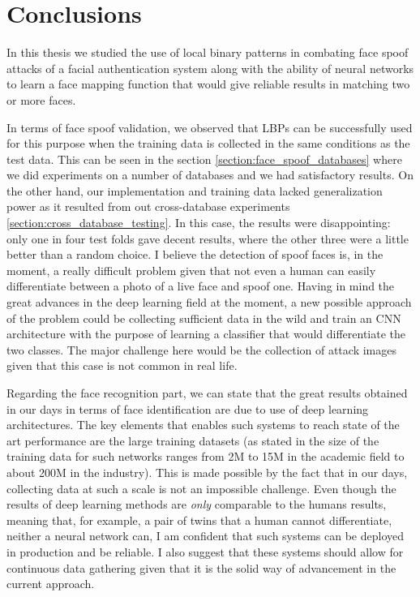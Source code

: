 \afterpage{\blankpage}
\chapter{Conclusions}
In this thesis we studied the use of local binary patterns in combating face spoof attacks of a facial authentication system along with the ability of neural networks to learn a face mapping function that would give reliable results in matching two or more faces. 

In terms of face spoof validation, we observed that LBPs can be successfully used for this purpose when the training data is collected in the same conditions as the test data. This can be seen in the section \ref{section:face_spoof_databases} where we did experiments on a number of databases and we had satisfactory results. On the other hand, our implementation and training data lacked generalization power as it resulted from out cross-database experiments \ref{section:cross_database_testing}. In this case, the results were disappointing: only one in four test folds gave decent results, where the other three were a little better than a random choice. I believe the detection of spoof faces is, in the moment, a really difficult problem given that not even a human can easily differentiate between a photo of a live face and spoof one. Having in mind the great advances in the deep learning field at the moment, a new possible approach of the problem could be collecting sufficient data in the wild and train an CNN architecture with the purpose of learning a classifier that would differentiate the two classes. The major challenge here would be the collection of attack images given that this case is not common in real life.

Regarding the face recognition part, we can state that the great results obtained in our days in terms of face identification are due to use of deep learning architectures. The key elements that enables such systems to reach state of the art performance are the large training datasets (as stated in \cite{LiuDBH15} the size of the training data for such networks ranges from 2M to 15M in the academic field to about 200M in the industry). This is made possible by the fact that in our days, collecting data at such a scale is not an impossible challenge. Even though the results of deep learning methods are \textit{only} comparable to the humans results, meaning that, for example, a pair of twins that a human cannot differentiate, neither a neural network can, I am confident that such systems can be deployed in production and be reliable. I also suggest that these systems should allow for continuous data gathering given that it is the solid way of advancement in the current approach.

